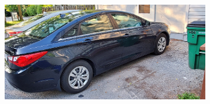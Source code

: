 \documentclass[12pt]{article}
\begin{document}
\begin{figure}[!ht]
    \centering
    \begin{subfigure}[b]{0.4\textwidth}
        \centering
        \includegraphics[width=\textwidth]{images/car_photos/20210703_192737.jpg} %
        \caption{}
    \end{subfigure}
    \hspace{2 pt}
    \begin{subfigure}[b]{0.4\textwidth}
        \centering

\end{subfigure}
\end{figure}
\end{document}
